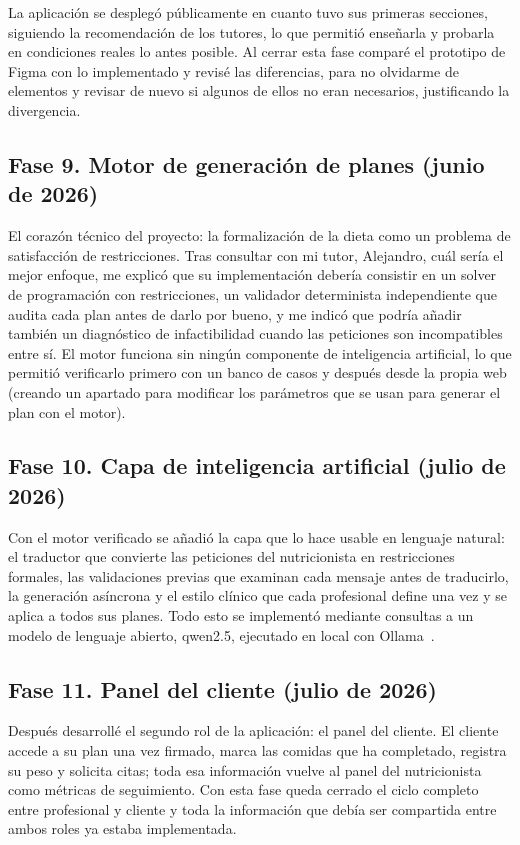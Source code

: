 La aplicación se desplegó públicamente en cuanto tuvo sus primeras secciones, siguiendo la recomendación de los tutores, lo que permitió enseñarla y probarla en condiciones reales lo antes posible. Al cerrar esta fase comparé el prototipo de Figma con lo implementado y revisé las diferencias, para no olvidarme de elementos y revisar de nuevo si algunos de ellos no eran necesarios, justificando la divergencia.

\subsection*{Fase 9. Motor de generación de planes (junio de 2026)}

El corazón técnico del proyecto: la formalización de la dieta como un problema de satisfacción de restricciones. Tras consultar con mi tutor, Alejandro, cuál sería el mejor enfoque, me explicó que su implementación debería consistir en un solver de programación con restricciones, un validador determinista independiente que audita cada plan antes de darlo por bueno, y me indicó que podría añadir también un diagnóstico de infactibilidad cuando las peticiones son incompatibles entre sí. El motor funciona sin ningún componente de inteligencia artificial, lo que permitió verificarlo primero con un banco de casos y después desde la propia web (creando un apartado para modificar los parámetros que se usan para generar el plan con el motor).

\subsection*{Fase 10. Capa de inteligencia artificial (julio de 2026)}

Con el motor verificado se añadió la capa que lo hace usable en lenguaje natural: el traductor que convierte las peticiones del nutricionista en restricciones formales, las validaciones previas que examinan cada mensaje antes de traducirlo, la generación asíncrona y el estilo clínico que cada profesional define una vez y se aplica a todos sus planes. Todo esto se implementó mediante consultas a un modelo de lenguaje abierto, qwen2.5, ejecutado en local con Ollama~\citep{ollama}.

\subsection*{Fase 11. Panel del cliente (julio de 2026)}

Después desarrollé el segundo rol de la aplicación: el panel del cliente. El cliente accede a su plan una vez firmado, marca las comidas que ha completado, registra su peso y solicita citas; toda esa información vuelve al panel del nutricionista como métricas de seguimiento. Con esta fase queda cerrado el ciclo completo entre profesional y cliente y toda la información que debía ser compartida entre ambos roles ya estaba implementada.

